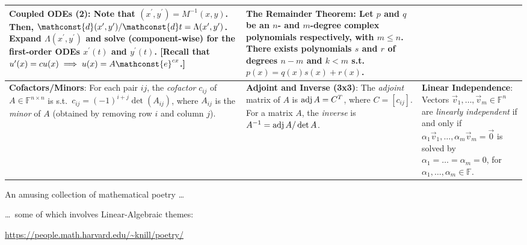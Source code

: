 \begin{tabular}{|m{.31\linewidth}|m{.31\linewidth}|m{.31\linewidth}|}
\textbf{Coupled ODEs (2)}:
    Note that $ (x^\prime, y^\prime) = M^{-1}(x, y) $. Then, $
    \mathconst{d}(x^\prime, y^\prime)/\mathconst{d}t = \Lambda(x^\prime,
    y^\prime) $. Expand $ \Lambda (x^\prime, y^\prime) $ and solve
    (component-wise) for the first-order ODEs $ x^\prime(t) $ and $ y^\prime(t)
    $. [Recall that $ u^\prime(x) = cu(x) \implies u(x) = A\mathconst{e}^{cx}
    $.] &

\textbf{The Remainder Theorem}:
    Let $ p $ and $ q $ be an $ n $- and $ m $-degree complex polynomials
    respectively, with $ m \leq n $. There exists polynomials $ s $ and $ r $ of
    degrees $ n-m $ and $ k < m $ s.t.\ $ p(x) = q(x)s(x) + r(x) $. \\

\hline

\textbf{Cofactors/Minors}:
    For each pair $ ij $, the \emph{cofactor} $ c_{ij} $ of $ A \in
    \mathbb{F}^{n \times n} $ is s.t.\ $ c_{ij} = (-1)^{i+j} \det(A_{ij}) $,
    where $ A_{ij} $ is the \emph{minor} of $ A $ (obtained by removing row $ i
    $ and column $ j $). &

\textbf{Adjoint and Inverse (3x3)}:
    The \emph{adjoint} matrix of $ A $ is $ \operatorname{adj} A = C^T $, where $ C = [c_{ij}]
    $. For a matrix $ A $, the \emph{inverse} is $ A^{-1} = \operatorname{adj} A/\det A $. &

\textbf{Linear Independence}:
    Vectors $ \vec{v}_1, \ldots, \vec{v}_m \in \mathbb{F}^n $ are \emph{linearly
    independent} if and only if $ \alpha_1\vec{v}_1, \ldots, \alpha_m\vec{v}_m =
    \vec{0} $ is solved by $ \alpha_1 = \ldots = \alpha_m = 0 $, for $ \alpha_1,
    \ldots, \alpha_m \in \mathbb{F} $. \\

\hline
\end{tabular}
\vfill
\begin{flushleft}
    An amusing collection of mathematical poetry \ldots

    \ldots\ some of which involves Linear-Algebraic themes:

    \vspace{.5em}
    \url{https://people.math.harvard.edu/~knill/poetry/}
\end{flushleft}


